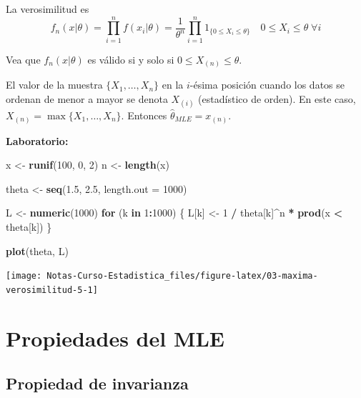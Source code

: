 \documentclass[
  12pt,
]{book}
\newenvironment{Shaded}{\begin{snugshade}}{\end{snugshade}}
\newcommand{\ControlFlowTok}[1]{\textcolor[rgb]{0.13,0.29,0.53}{\textbf{#1}}}
\newcommand{\DataTypeTok}[1]{\textcolor[rgb]{0.13,0.29,0.53}{#1}}
\newcommand{\DecValTok}[1]{\textcolor[rgb]{0.00,0.00,0.81}{#1}}
\newcommand{\FloatTok}[1]{\textcolor[rgb]{0.00,0.00,0.81}{#1}}
\newcommand{\KeywordTok}[1]{\textcolor[rgb]{0.13,0.29,0.53}{\textbf{#1}}}
\newcommand{\NormalTok}[1]{#1}
\newcommand{\OperatorTok}[1]{\textcolor[rgb]{0.81,0.36,0.00}{\textbf{#1}}}
\newcommand{\StringTok}[1]{\textcolor[rgb]{0.31,0.60,0.02}{#1}}
\begin{document}
La verosimilitud es
\[f_n(x|\theta) = \prod_{i=1}^{n} f(x_i|\theta) = \dfrac 1{\theta^n} \prod_{i=1}^n 1_{\{0\leq X_i\leq \theta\}} \quad 0\leq X_i \leq \theta \;\forall i\]

Vea que \(f_n(x|\theta)\) es válido si y solo si \(0\leq X_{(n)}\leq \theta\).

El valor de la muestra \(\{X_1,\dots, X_n\}\) en la \(i\)-ésima posición cuando los
datos se ordenan de menor a mayor se denota \(X_{(i)}\) (estadístico de orden). En
este caso, \(X_{(n)} = \max\{X_1,\dots, X_n\}\). Entonces \(\hat\theta_{MLE} = x_{(n)}\).

\textbf{Laboratorio:}

\begin{Shaded}
\begin{Highlighting}[]
\NormalTok{x \textless{}{-}}\StringTok{ }\KeywordTok{runif}\NormalTok{(}\DecValTok{100}\NormalTok{, }\DecValTok{0}\NormalTok{, }\DecValTok{2}\NormalTok{)}
\NormalTok{n \textless{}{-}}\StringTok{ }\KeywordTok{length}\NormalTok{(x)}

\NormalTok{theta \textless{}{-}}\StringTok{ }\KeywordTok{seq}\NormalTok{(}\FloatTok{1.5}\NormalTok{, }\FloatTok{2.5}\NormalTok{, }\DataTypeTok{length.out =} \DecValTok{1000}\NormalTok{)}

\NormalTok{L \textless{}{-}}\StringTok{ }\KeywordTok{numeric}\NormalTok{(}\DecValTok{1000}\NormalTok{)}
\ControlFlowTok{for}\NormalTok{ (k }\ControlFlowTok{in} \DecValTok{1}\OperatorTok{:}\DecValTok{1000}\NormalTok{) \{}
\NormalTok{  L[k] \textless{}{-}}\StringTok{ }\DecValTok{1} \OperatorTok{/}\StringTok{ }\NormalTok{theta[k]}\OperatorTok{\^{}}\NormalTok{n }\OperatorTok{*}\StringTok{ }\KeywordTok{prod}\NormalTok{(x }\OperatorTok{\textless{}}\StringTok{ }\NormalTok{theta[k])}
\NormalTok{\}}

\KeywordTok{plot}\NormalTok{(theta, L)}
\end{Highlighting}
\end{Shaded}

\begin{center}\texttt{[image: Notas-Curso-Estadistica\_files/figure-latex/03-maxima-verosimilitud-5-1]} \end{center}

\hypertarget{propiedades-del-mle}{%
\section{Propiedades del MLE}\label{propiedades-del-mle}}

\hypertarget{propiedad-de-invarianza}{%
\subsection{Propiedad de invarianza}\label{propiedad-de-invarianza}}
\end{document}
